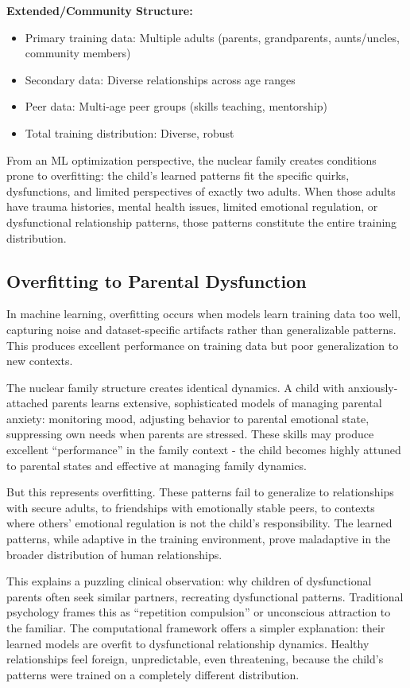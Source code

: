 \documentclass{article}
\begin{document}
\textbf{Extended/Community Structure:}
\begin{itemize}
\item Primary training data: Multiple adults (parents, grandparents, aunts/uncles, community members)
\item Secondary data: Diverse relationships across age ranges
\item Peer data: Multi-age peer groups (skills teaching, mentorship)
\item Total training distribution: Diverse, robust
\end{itemize}

From an ML optimization perspective, the nuclear family creates conditions prone to overfitting: the child's learned patterns fit the specific quirks, dysfunctions, and limited perspectives of exactly two adults. When those adults have trauma histories, mental health issues, limited emotional regulation, or dysfunctional relationship patterns, those patterns constitute the entire training distribution.

\subsection{Overfitting to Parental Dysfunction}

In machine learning, overfitting occurs when models learn training data too well, capturing noise and dataset-specific artifacts rather than generalizable patterns. This produces excellent performance on training data but poor generalization to new contexts.

The nuclear family structure creates identical dynamics. A child with anxiously-attached parents learns extensive, sophisticated models of managing parental anxiety: monitoring mood, adjusting behavior to parental emotional state, suppressing own needs when parents are stressed. These skills may produce excellent ``performance'' in the family context - the child becomes highly attuned to parental states and effective at managing family dynamics.

But this represents overfitting. These patterns fail to generalize to relationships with secure adults, to friendships with emotionally stable peers, to contexts where others' emotional regulation is not the child's responsibility. The learned patterns, while adaptive in the training environment, prove maladaptive in the broader distribution of human relationships.

This explains a puzzling clinical observation: why children of dysfunctional parents often seek similar partners, recreating dysfunctional patterns. Traditional psychology frames this as ``repetition compulsion'' or unconscious attraction to the familiar. The computational framework offers a simpler explanation: their learned models are overfit to dysfunctional relationship dynamics. Healthy relationships feel foreign, unpredictable, even threatening, because the child's patterns were trained on a completely different distribution.
\end{document}
